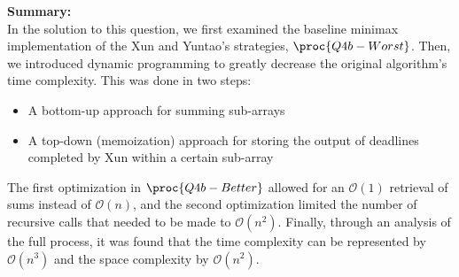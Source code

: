 \textbf{Summary:}\\
In the solution to this question, we first examined the baseline minimax implementation of the Xun and Yuntao's strategies, $\proc{Q4b-Worst}$.
Then, we introduced dynamic programming to greatly decrease the original algorithm's time complexity.
This was done in two steps:
\begin{spacing}{1}
    \begin{itemize}
        \item A bottom-up approach for summing sub-arrays
        \item A top-down (memoization) approach for storing the output of deadlines completed by Xun within a certain sub-array
    \end{itemize}
\end{spacing}

The first optimization in $\proc{Q4b-Better}$ allowed for an $\mathcal{O}(1)$ retrieval of sums instead of $\mathcal{O}(n)$, and the second optimization limited the number of recursive calls that needed to be made to $\mathcal{O}(n^2)$.
Finally, through an analysis of the full process, it was found that the time complexity can be represented by $\mathcal{O}(n^3)$ and the space complexity by $\mathcal{O}(n^2)$.